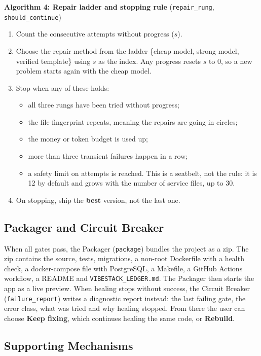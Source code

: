 \documentclass[12pt,a4paper]{report}
\begin{document}
\noindent\textbf{Algorithm 4: Repair ladder and stopping rule} (\texttt{repair\_rung}, \texttt{should\_continue})
\begin{enumerate}
    \item Count the consecutive attempts without progress ($s$).
    \item Choose the repair method from the ladder \{cheap model, strong model, verified template\} using $s$ as the index. Any progress resets $s$ to $0$, so a new problem starts again with the cheap model.
    \item Stop when any of these holds:
    \begin{itemize}
        \item all three rungs have been tried without progress;
        \item the file fingerprint repeats, meaning the repairs are going in circles;
        \item the money or token budget is used up;
        \item more than three transient failures happen in a row;
        \item a safety limit on attempts is reached. This is a seatbelt, not the rule: it is 12 by default and grows with the number of service files, up to 30.
    \end{itemize}
    \item On stopping, ship the \textbf{best} version, not the last one.
\end{enumerate}

\subsection{Packager and Circuit Breaker}

When all gates pass, the Packager (\texttt{package}) bundles the project as a zip. The zip contains the source, tests, migrations, a non-root Dockerfile with a health check, a docker-compose file with PostgreSQL, a Makefile, a GitHub Actions workflow, a README and \texttt{VIBESTACK\_LEDGER.md}. The Packager then starts the app as a live preview. When healing stops without success, the Circuit Breaker (\texttt{failure\_report}) writes a diagnostic report instead: the last failing gate, the error class, what was tried and why healing stopped. From there the user can choose \textbf{Keep fixing}, which continues healing the same code, or \textbf{Rebuild}.

\subsection{Supporting Mechanisms}
\end{document}
